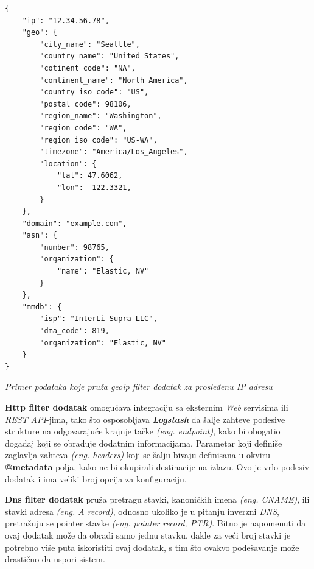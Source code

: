 \begin{listing}[H]
\begin{verbatim}
{
    "ip": "12.34.56.78",
    "geo": {
        "city_name": "Seattle",
        "country_name": "United States",
        "cotinent_code": "NA",
        "continent_name": "North America",
        "country_iso_code": "US",
        "postal_code": 98106,
        "region_name": "Washington",
        "region_code": "WA",
        "region_iso_code": "US-WA",
        "timezone": "America/Los_Angeles",
        "location": {
            "lat": 47.6062,
            "lon": -122.3321,
        }
    },
    "domain": "example.com",
    "asn": {
        "number": 98765,
        "organization": {
            "name": "Elastic, NV"
        }
    },
    "mmdb": {
        "isp": "InterLi Supra LLC",
        "dma_code": 819,
        "organization": "Elastic, NV"
    }
}
\end{verbatim}
\caption{\textit{Primer podataka koje pruža geoip filter dodatak za prosleđenu IP adresu}}
\label{code:primer-podataka-koje-pruza-geoip-filter-dodatak-za-prosledjenu-ip-adresu}
\end{listing}

\par
\textbf{Http filter dodatak} \cite{http-plugin} omogućava integraciju sa eksternim \textit{Web} servisima ili \textit{REST API}-jima, tako što osposobljava \textit{\textbf{Logstash}} da šalje zahteve podesive strukture na odgovarajuće krajnje tačke \textit{(eng. endpoint)}, kako bi obogatio događaj koji se obrađuje dodatnim informacijama. Parametar koji definiše zaglavlja zahteva \textit{(eng. headers)} koji se šalju bivaju definisana u okviru \textbf{@metadata} polja, kako ne bi okupirali destinacije na izlazu. Ovo je vrlo podesiv dodatak i ima veliki broj opcija za konfiguraciju.

\par
\textbf{Dns filter dodatak} \cite{dns-plugin} pruža pretragu stavki, kanoničkih imena \textit{(eng. CNAME)}, ili stavki adresa \textit{(eng. A record)}, odnosno ukoliko je u pitanju inverzni \textit{DNS}, pretražuju se pointer stavke \textit{(eng. pointer record, PTR)}. Bitno je napomenuti da ovaj dodatak može da obradi samo jednu stavku, dakle za veći broj stavki je potrebno više puta iskoristiti ovaj dodatak, s tim što ovakvo podešavanje može drastično da uspori sistem. 

